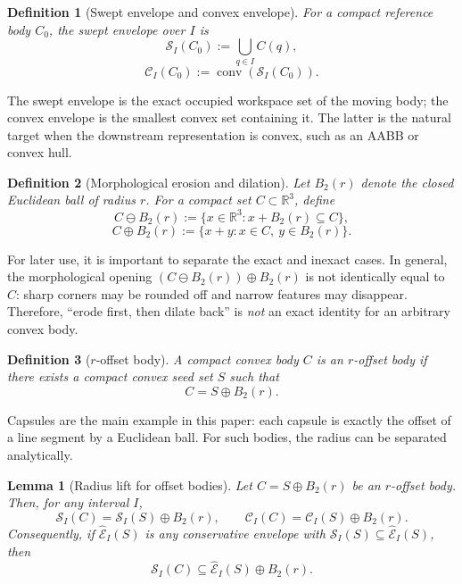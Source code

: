\documentclass[journal]{IEEEtran}
\newtheorem{definition}{Definition}
\newtheorem{lemma}{Lemma}
\newcommand{\Real}{\ensuremath{\mathbb{R}}}
\begin{document}
\begin{definition}[Swept envelope and convex envelope]
For a compact reference body $C_0$, the swept envelope over $I$ is
\[
\mathcal{S}_I(C_0) := \bigcup_{q\in I} C(q),
\]
\[
\mathcal{C}_I(C_0) := \operatorname{conv}(\mathcal{S}_I(C_0)).
\]
\end{definition}

The swept envelope is the exact occupied workspace set of the moving body; the
convex envelope is the smallest convex set containing it. The latter is the
natural target when the downstream representation is convex, such as an AABB or
convex hull.

\begin{definition}[Morphological erosion and dilation]
Let $B_2(r)$ denote the closed Euclidean ball of radius $r$. For a compact set
$C \subset \Real^3$, define
\[
C \ominus B_2(r) := \{x \in \Real^3 : x + B_2(r) \subseteq C\},
\]
\[
C \oplus B_2(r) := \{x+y : x\in C,\ y\in B_2(r)\}.
\]
\end{definition}

For later use, it is important to separate the exact and inexact cases. In
general, the morphological opening $(C \ominus B_2(r)) \oplus B_2(r)$ is not
identically equal to $C$: sharp corners may be rounded off and narrow features
may disappear. Therefore, ``erode first, then dilate back'' is \emph{not} an
exact identity for an arbitrary convex body.

\begin{definition}[$r$-offset body]
A compact convex body $C$ is an $r$-offset body if there exists a compact convex
seed set $S$ such that
\[
C = S \oplus B_2(r).
\]
\end{definition}

Capsules are the main example in this paper: each capsule is exactly the offset
of a line segment by a Euclidean ball. For such bodies, the radius can be
separated analytically.

\begin{lemma}[Radius lift for offset bodies]\label{lem:offset_lift}
Let $C = S \oplus B_2(r)$ be an $r$-offset body. Then, for any interval $I$,
\[
\mathcal{S}_I(C) = \mathcal{S}_I(S) \oplus B_2(r),
\qquad
\mathcal{C}_I(C) = \mathcal{C}_I(S) \oplus B_2(r).
\]
Consequently, if $\widehat{\mathcal{E}}_I(S)$ is any conservative envelope with
$\mathcal{S}_I(S) \subseteq \widehat{\mathcal{E}}_I(S)$, then
\[
\mathcal{S}_I(C) \subseteq \widehat{\mathcal{E}}_I(S) \oplus B_2(r).
\]
\end{lemma}
\end{document}
